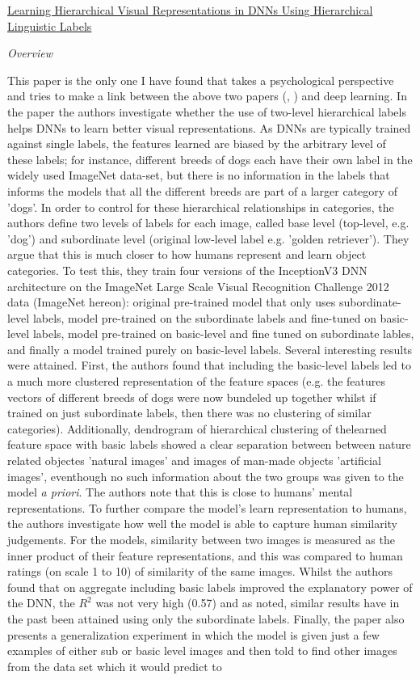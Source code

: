 \documentclass{report}
\begin{document}
\underline{Learning Hierarchical Visual Representations in DNNs Using Hierarchical Linguistic Labels \cite{Peterson2018}}

\textit{Overview}

This paper is the only one I have found that takes a psychological perspective and tries to make a link between the above two papers (\cite{Rosch1976}, \cite{Joliceur1984}) and deep learning. In the paper the authors investigate whether the use of two-level hierarchical labels helps DNNs to learn better visual representations. As DNNs are typically trained against single labels, the features learned are biased by the arbitrary level of these labels; for instance, different breeds of dogs each have their own label in the widely used ImageNet data-set, but there is no information in the labels that informs the models that all the different breeds are part of a larger category of 'dogs'. In order to control for these hierarchical relationships in categories, the authors define two levels of labels for each image, called base level (top-level, e.g. 'dog') and subordinate level (original low-level label e.g. 'golden retriever'). They argue that this is much closer to how humans represent and learn object categories. To test this, they train four versions of the InceptionV3 \cite{Szegedy2015} DNN architecture on the ImageNet Large Scale Visual Recognition Challenge 2012 data (ImageNet hereon): original pre-trained model that only uses subordinate-level labels, model pre-trained on the subordinate labels and fine-tuned on basic-level labels, model pre-trained on basic-level and fine tuned on subordinate lables, and finally a model trained purely on basic-level labels. Several interesting results were attained. First, the authors found that including the basic-level labels led to a much more clustered representation of the feature spaces (e.g. the features vectors of different breeds of dogs were now bundeled up together whilst if trained on just subordinate labels, then there was no clustering of similar categories). Additionally, dendrogram of hierarchical clustering of thelearned feature space with basic labels showed a clear separation between between nature related objectes 'natural images' and images of man-made objects 'artificial images', eventhough no such information about the two groups was given to the model \textit{a priori}. The authors note that this is close to humans' mental representations. To further compare the model's learn representation to humans, the authors investigate how well the model is able to capture human similarity judgements. For the models, similarity between two images is measured as the inner product of their feature representations, and this was compared to human ratings (on scale 1 to 10) of similarity of the same images. Whilst the authors found that on aggregate including basic labels improved the explanatory power of the DNN, the $R^2$ was not very high (0.57) and as noted, similar results have in the past been attained using only the subordinate labels. Finally, the paper also presents a generalization experiment in which the model is given just a few examples of either sub or basic level images and then told to find other images from the data set which it would predict to 
\end{document}
